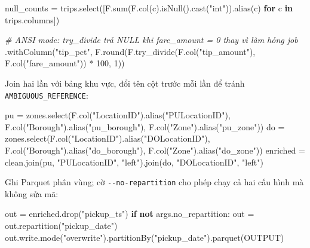 \documentclass[
  12pt,
  a4paper,
]{report}
\newenvironment{Shaded}{}{}
\newcommand{\BuiltInTok}[1]{\textcolor[rgb]{0.00,0.50,0.00}{#1}}
\newcommand{\CommentTok}[1]{\textcolor[rgb]{0.38,0.63,0.69}{\textit{#1}}}
\newcommand{\ControlFlowTok}[1]{\textcolor[rgb]{0.00,0.44,0.13}{\textbf{#1}}}
\newcommand{\DecValTok}[1]{\textcolor[rgb]{0.25,0.63,0.44}{#1}}
\newcommand{\KeywordTok}[1]{\textcolor[rgb]{0.00,0.44,0.13}{\textbf{#1}}}
\newcommand{\NormalTok}[1]{#1}
\newcommand{\OperatorTok}[1]{\textcolor[rgb]{0.40,0.40,0.40}{#1}}
\newcommand{\StringTok}[1]{\textcolor[rgb]{0.25,0.44,0.63}{#1}}
\begin{document}
\begin{Shaded}
\begin{Highlighting}[]
\NormalTok{null\_counts }\OperatorTok{=}\NormalTok{ trips.select([F.}\BuiltInTok{sum}\NormalTok{(F.col(c).isNull().cast(}\StringTok{"int"}\NormalTok{)).alias(c)}
                            \ControlFlowTok{for}\NormalTok{ c }\KeywordTok{in}\NormalTok{ trips.columns])}

\CommentTok{\# ANSI mode: try\_divide trả NULL khi fare\_amount = 0 thay vì làm hỏng job}
\NormalTok{.withColumn(}\StringTok{"tip\_pct"}\NormalTok{,}
\NormalTok{            F.}\BuiltInTok{round}\NormalTok{(F.try\_divide(F.col(}\StringTok{"tip\_amount"}\NormalTok{), F.col(}\StringTok{"fare\_amount"}\NormalTok{)) }\OperatorTok{*} \DecValTok{100}\NormalTok{, }\DecValTok{1}\NormalTok{))}
\end{Highlighting}
\end{Shaded}

Join hai lần với bảng khu vực, đổi tên cột trước mỗi lần để tránh
\texttt{AMBIGUOUS\_}\allowbreak{}\texttt{REFERENCE}\allowbreak{}:

\begin{Shaded}
\begin{Highlighting}[]
\NormalTok{pu }\OperatorTok{=}\NormalTok{ zones.select(F.col(}\StringTok{"LocationID"}\NormalTok{).alias(}\StringTok{"PULocationID"}\NormalTok{),}
\NormalTok{                  F.col(}\StringTok{"Borough"}\NormalTok{).alias(}\StringTok{"pu\_borough"}\NormalTok{), F.col(}\StringTok{"Zone"}\NormalTok{).alias(}\StringTok{"pu\_zone"}\NormalTok{))}
\NormalTok{do }\OperatorTok{=}\NormalTok{ zones.select(F.col(}\StringTok{"LocationID"}\NormalTok{).alias(}\StringTok{"DOLocationID"}\NormalTok{),}
\NormalTok{                  F.col(}\StringTok{"Borough"}\NormalTok{).alias(}\StringTok{"do\_borough"}\NormalTok{), F.col(}\StringTok{"Zone"}\NormalTok{).alias(}\StringTok{"do\_zone"}\NormalTok{))}
\NormalTok{enriched }\OperatorTok{=}\NormalTok{ clean.join(pu, }\StringTok{"PULocationID"}\NormalTok{, }\StringTok{"left"}\NormalTok{).join(do, }\StringTok{"DOLocationID"}\NormalTok{, }\StringTok{"left"}\NormalTok{)}
\end{Highlighting}
\end{Shaded}

Ghi Parquet phân vùng; cờ \texttt{-\/-no-repartition}\allowbreak{} cho
phép chạy cả hai cấu hình mà không sửa mã:

\begin{Shaded}
\begin{Highlighting}[]
\NormalTok{out }\OperatorTok{=}\NormalTok{ enriched.drop(}\StringTok{"pickup\_ts"}\NormalTok{)}
\ControlFlowTok{if} \KeywordTok{not}\NormalTok{ args.no\_repartition:}
\NormalTok{    out }\OperatorTok{=}\NormalTok{ out.repartition(}\StringTok{"pickup\_date"}\NormalTok{)}
\NormalTok{out.write.mode(}\StringTok{"overwrite"}\NormalTok{).partitionBy(}\StringTok{"pickup\_date"}\NormalTok{).parquet(OUTPUT)}
\end{Highlighting}
\end{Shaded}
\end{document}
